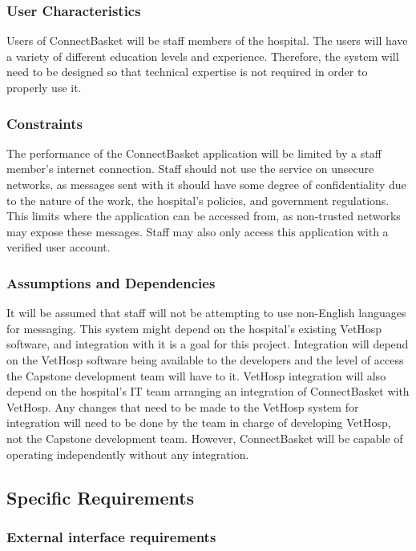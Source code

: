 \documentclass[onecolumn, draftclsnofoot,10pt, compsoc]{IEEEtran}
\begin{document}
\subsubsection{User Characteristics}
Users of ConnectBasket will be staff members of the hospital. The users will have a variety of different education levels and experience. Therefore, the system will need to be designed so that technical expertise is not required in order to properly use it.

\subsubsection{Constraints}
The performance of the ConnectBasket application will be limited by a staff member's internet connection. Staff should not use the service on unsecure networks, as messages sent with it should have some degree of confidentiality due to the nature of the work, the hospital's policies, and government regulations. This limits where the application can be accessed from, as non-trusted networks may expose these messages. Staff may also only access this application with a verified user account.

\subsubsection{Assumptions and Dependencies}
It will be assumed that staff will not be attempting to use non-English languages for messaging. This system might depend on the hospital's existing VetHosp software, and integration with it is a goal for this project. Integration will depend on the VetHosp software being available to the developers and the level of access the Capstone development team will have to it. VetHosp integration will also depend on the hospital's IT team arranging an integration of ConnectBasket with VetHosp. Any changes that need to be made to the VetHosp system for integration will need to be done by the team in charge of developing VetHosp, not the Capstone development team. However, ConnectBasket will be capable of operating independently without any integration.

\subsection{Specific Requirements}

\subsubsection{External interface requirements}
\end{document}
